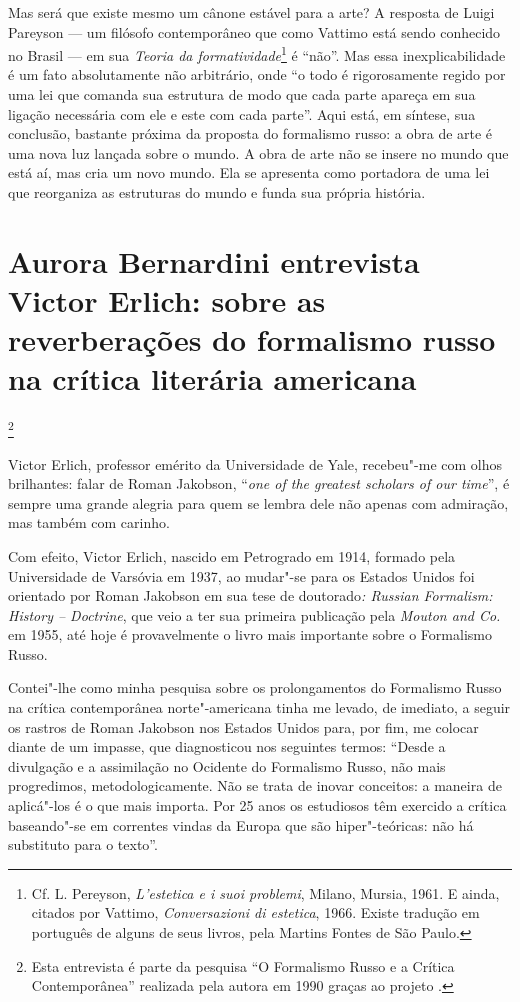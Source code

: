 Mas será que existe mesmo um cânone estável para a arte? A resposta de
Luigi Pareyson --- um filósofo contemporâneo que como Vattimo está sendo
conhecido no Brasil --- em sua \emph{Teoria da formatividade}\footnote{Cf.
  L. Pereyson, \emph{L'estetica e i suoi problemi}, Milano, Mursia,
  1961. E ainda, citados por Vattimo, \emph{Conversazioni di estetica},
  1966. Existe tradução em português de alguns de seus livros, pela
  Martins Fontes de São Paulo.} é ``não''. Mas essa inexplicabilidade é
um fato absolutamente não arbitrário, onde ``o todo é rigorosamente
regido por uma lei que comanda sua estrutura de modo que cada parte
apareça em sua ligação necessária com ele e este com cada parte''. Aqui
está, em síntese, sua conclusão, bastante próxima da proposta do
formalismo russo: a obra de arte é uma nova luz lançada sobre o mundo. A
obra de arte não se insere no mundo que está aí, mas cria um novo mundo.
Ela se apresenta como portadora de uma lei que reorganiza as estruturas
do mundo e funda sua própria história.

\chapter*{Aurora Bernardini entrevista Victor Erlich: sobre as reverberações do formalismo russo na crítica literária americana}\footnote{Esta
  entrevista é parte da pesquisa ``O Formalismo Russo e a Crítica
  Contemporânea'' realizada pela autora em 1990 graças ao projeto
  .}


Victor Erlich, professor emérito da Universidade de Yale, recebeu"-me com
olhos brilhantes: falar de Roman Jakobson, ``\emph{one of the greatest
scholars of our time}'', é sempre uma grande alegria para quem se lembra
dele não apenas com admiração, mas também com carinho.

Com efeito, Victor Erlich, nascido em Petrogrado em 1914, formado pela
Universidade de Varsóvia em 1937, ao mudar"-se para os Estados Unidos foi
orientado por Roman Jakobson em sua tese de doutorado\emph{: Russian
Formalism: History -- Doctrine}, que veio a ter sua primeira publicação
pela \emph{Mouton and Co.} em 1955, até hoje é provavelmente o livro
mais importante sobre o Formalismo Russo.

Contei"-lhe como minha pesquisa sobre os prolongamentos do Formalismo
Russo na crítica contemporânea norte"-americana tinha me levado, de
imediato, a seguir os rastros de Roman Jakobson nos Estados Unidos para,
por fim, me colocar diante de um impasse, que diagnosticou nos seguintes
termos: ``Desde a divulgação e a assimilação no Ocidente do Formalismo
Russo, não mais progredimos, metodologicamente. Não se trata de inovar
conceitos: a maneira de aplicá"-los é o que mais importa. Por 25 anos os
estudiosos têm exercido a crítica baseando"-se em correntes vindas da
Europa que são hiper"-teóricas: não há substituto para o texto''.

